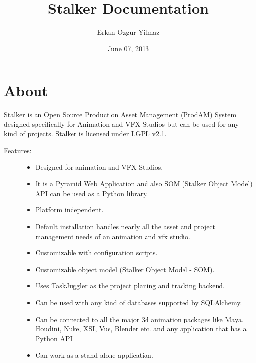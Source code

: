 \documentclass[a4paper,10pt,english]{sphinxmanual}
\title{Stalker Documentation}
\date{June 07, 2013}
\author{Erkan Ozgur Yilmaz}
\begin{document}
\maketitle
\tableofcontents
{}\label{contents::doc}



\chapter{About}
\label{about::doc}\label{about:about}\label{about:table-of-contents}\label{about:contents}
Stalker is an Open Source Production Asset Management (ProdAM) System designed
specifically for Animation and VFX Studios but can be used for any kind of
projects. Stalker is licensed under LGPL v2.1.
\begin{description}
\item[{Features:}] \leavevmode\begin{itemize}
\item {} 
Designed for animation and VFX Studios.

\item {} 
It is a Pyramid Web Application and also SOM (Stalker Object Model) API can
be used as a Python library.

\item {} 
Platform independent.

\item {} 
Default installation handles nearly all the asset and project management
needs of an animation and vfx studio.

\item {} 
Customizable with configuration scripts.

\item {} 
Customizable object model (Stalker Object Model - SOM).

\item {} 
Uses TaskJuggler as the project planing and tracking backend.

\item {} 
Can be used with any kind of databases supported by SQLAlchemy.

\item {} 
Can be connected to all the major 3d animation packages like Maya, Houdini,
Nuke, XSI, Vue, Blender etc. and any application that has a Python API.

\item {} 
Can work as a stand-alone application.

\end{itemize}


\end{description}
\end{document}
